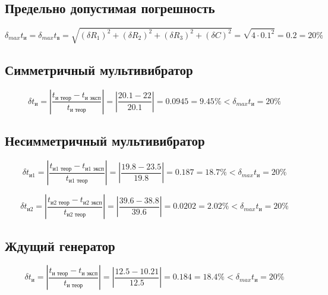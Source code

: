 \subsection{Предельно допустимая погрешность}

\begin{displaymath}
	\delta_{max} t_{\text{и}} = \delta_{max} t_{\text{в}} =\sqrt{(\delta R_1)^2 + (\delta R_2)^2 + (\delta R_3)^2 + (\delta C)^2} = \sqrt{4 \cdot 0.1^2} = 0.2 = 20 \%
\end{displaymath}

\subsection{Симметричный мультивибратор}

\begin{displaymath}
	\delta t_{\text{и}} = \left| \frac{t_{\text{и теор}} - t_{\text{и эксп}}}{t_{\text{и теор}}} \right| = \left| \frac{20.1 - 22}{20.1} \right| = 0.0945 = 9.45 \% < \delta_{max} t_{\text{и}} = 20 \%
\end{displaymath}

\subsection{Несимметричный мультивибратор}

\begin{displaymath}
	\delta t_{\text{и1}} = \left| \frac{t_{\text{и1 теор}} - t_{\text{и1 эксп}}}{t_{\text{и1 теор}}} \right| = \left| \frac{19.8 - 23.5}{19.8} \right| = 0.187 = 18.7 \% < \delta_{max} t_{\text{и}} = 20 \%
\end{displaymath}

\begin{displaymath}
	\delta t_{\text{и2}} = \left| \frac{t_{\text{и2 теор}} - t_{\text{и2 эксп}}}{t_{\text{и2 теор}}} \right| = \left| \frac{39.6 - 38.8}{39.6} \right| = 0.0202 = 2.02 \% < \delta_{max} t_{\text{и}} = 20 \%
\end{displaymath}

\subsection{Ждущий генератор}

\begin{displaymath}
	\delta t_{\text{и}} = \left| \frac{t_{\text{и теор}} - t_{\text{и эксп}}}{t_{\text{и теор}}} \right| = \left| \frac{12.5 - 10.21}{12.5} \right| = 0.184 = 18.4 \% < \delta_{max} t_{\text{и}} = 20 \%
\end{displaymath}

